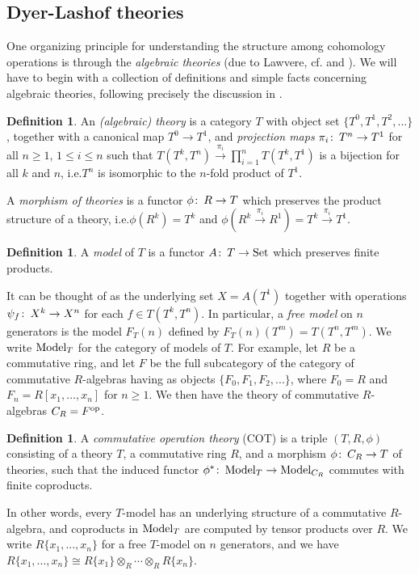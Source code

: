 \documentclass{gtpart}
\theoremstyle{definition}
\newtheorem{defn}[thm]{Definition}
\theoremstyle{remark}
\def\co{\colon\thinspace}
\newcommand{\Model}{{\rm Model}}
\begin{document}
\subsection{Dyer-Lashof theories}
\label{subsec:DL}

One organizing principle for understanding the structure among cohomology operations 
is through the {\em algebraic theories} (due to Lawvere, cf. 
\cite{lawvere} and \cite[chapter 3]{borceux}).  We will have to begin with a 
collection of definitions and simple facts concerning algebraic theories, 
following precisely the discussion in \cite[sections 5--9]{lpo}.  
\begin{defn}
 An {\em (algebraic) theory} is a category $T$ with object set 
 $\{T^0,T^1,T^2,...\}$, together with a canonical map 
 $T^0 \to T^1$, and {\em projection maps} $\pi_i\co T^n \to T^1$ for all 
 $n \geq 1$, $1 \leq i \leq n$ such that $T(T^k,T^n) \xrightarrow{\pi_i} 
 \prod_{i=1}^n T(T^k,T^1)$ is a bijection for all $k$ and $n$, 
 i.e.\thinspace$T^n$ is isomorphic to the $n$-fold product of $T^1$.  
 
 A {\em morphism of theories} is a functor $\phi\co R \to T$ which 
 preserves the product structure of a theory, i.e.\thinspace$\phi(R^k) = 
 T^k$ and $\phi(R^k \stackrel{\pi_i}{\longrightarrow} R^1) = T^k 
 \stackrel{\pi_i}{\longrightarrow} T^1$.  
\end{defn}

\begin{defn}
 A {\em model} of $T$ is a functor $A\co T \to \rm{Set}$ which 
 preserves finite products.  
\end{defn}
It can be thought of as the underlying set $X = A(T^1)$ together with 
operations $\psi_f\co X^k \to X^n$ for each 
$f \in T(T^k,T^n)$.  In particular, a {\em free model} on $n$ generators 
is the model $F_T(n)$ defined by $F_T(n)(T^m) = T(T^n,T^m)$.  We write 
$\Model_T$ for the category of models of $T$.  For example, let $R$ be a 
commutative ring, and let $F$ be the full subcategory of the category of 
commutative $R$-algebras having as objects $\{F_0,F_1,F_2,...\}$, where 
$F_0 = R$ and $F_n = R[x_1,...,x_n]$ for $n \geq 1$.  We then have the 
theory of commutative $R$-algebras $C_R = F^{\rm op}$.  

\begin{defn}
 A {\em commutative operation theory} (COT) is a triple $(T,R,\phi)$ 
 consisting of a theory $T$, a commutative ring $R$, and a morphism 
 $\phi\co C_R \to T$ of theories, such that the induced functor 
 $\phi^*\co \Model_T \to \Model_{C_R}$ commutes with finite coproducts.  
\end{defn}
In other words, every $T$-model has an underlying structure of a 
commutative $R$-algebra, and coproducts in $\Model_T$ are computed by 
tensor products over $R$.  We write $R\{x_1,...,x_n\}$ for a free 
$T$-model on $n$ generators, and we have $R\{x_1,...,x_n\} \cong 
R\{x_1\} \otimes_R \cdots \otimes_R R\{x_n\}$.  
\end{document}
